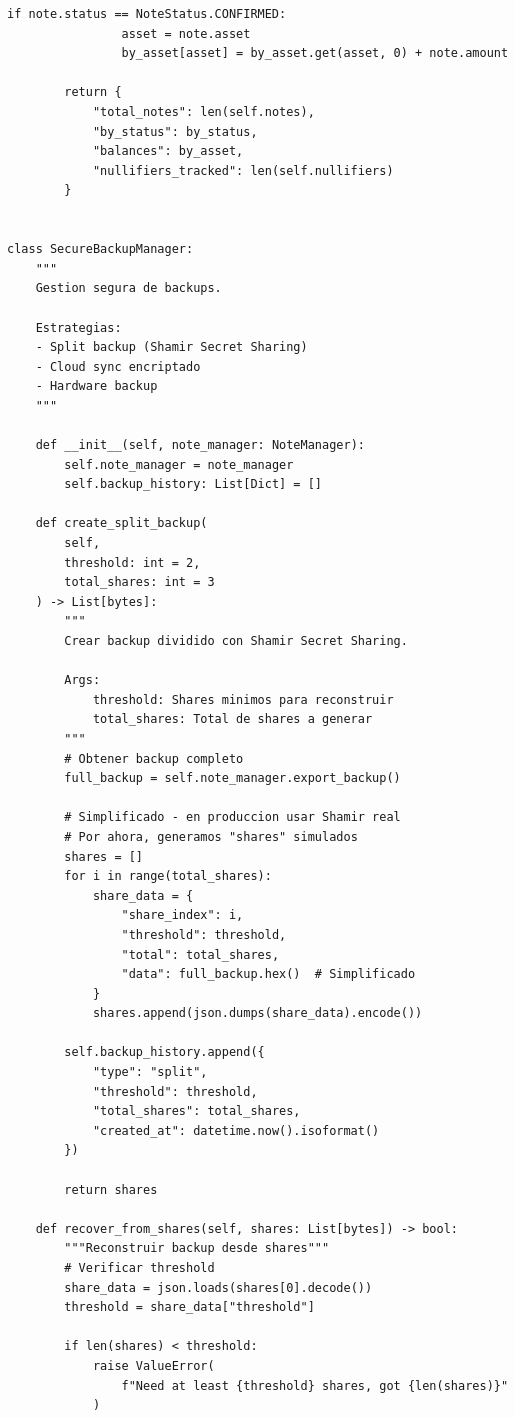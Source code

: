 \documentclass[11pt,a4paper,twoside]{book}
\theoremstyle{definition}
\theoremstyle{remark}
\begin{document}
\begin{lstlisting}[style=python, caption={Sistema completo de gestión de notes}]
            if note.status == NoteStatus.CONFIRMED:
                asset = note.asset
                by_asset[asset] = by_asset.get(asset, 0) + note.amount
        
        return {
            "total_notes": len(self.notes),
            "by_status": by_status,
            "balances": by_asset,
            "nullifiers_tracked": len(self.nullifiers)
        }


class SecureBackupManager:
    """
    Gestion segura de backups.
    
    Estrategias:
    - Split backup (Shamir Secret Sharing)
    - Cloud sync encriptado
    - Hardware backup
    """
    
    def __init__(self, note_manager: NoteManager):
        self.note_manager = note_manager
        self.backup_history: List[Dict] = []
    
    def create_split_backup(
        self,
        threshold: int = 2,
        total_shares: int = 3
    ) -> List[bytes]:
        """
        Crear backup dividido con Shamir Secret Sharing.
        
        Args:
            threshold: Shares minimos para reconstruir
            total_shares: Total de shares a generar
        """
        # Obtener backup completo
        full_backup = self.note_manager.export_backup()
        
        # Simplificado - en produccion usar Shamir real
        # Por ahora, generamos "shares" simulados
        shares = []
        for i in range(total_shares):
            share_data = {
                "share_index": i,
                "threshold": threshold,
                "total": total_shares,
                "data": full_backup.hex()  # Simplificado
            }
            shares.append(json.dumps(share_data).encode())
        
        self.backup_history.append({
            "type": "split",
            "threshold": threshold,
            "total_shares": total_shares,
            "created_at": datetime.now().isoformat()
        })
        
        return shares
    
    def recover_from_shares(self, shares: List[bytes]) -> bool:
        """Reconstruir backup desde shares"""
        # Verificar threshold
        share_data = json.loads(shares[0].decode())
        threshold = share_data["threshold"]
        
        if len(shares) < threshold:
            raise ValueError(
                f"Need at least {threshold} shares, got {len(shares)}"
            )
        

\end{lstlisting}
\end{document}
